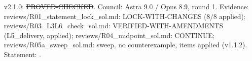\begin{proposition}\label{reg:W2-UNI_F-UNI}
\end{proposition}
\begin{statusbox}
 v2.1.0: \st{PROVED-CHECKED}. Council: Astra 9.0 / Opus 8.9, round 1. Evidence: reviews/R01\_statement\_lock\_sol.md: LOCK-WITH-CHANGES (8/8 applied); reviews/R03\_L3L6\_check\_sol.md: VERIFIED-WITH-AMENDMENTS (L5\_delivery, applied); reviews/R04\_midpoint\_sol.md: CONTINUE; reviews/R05a\_sweep\_sol.md: sweep, no counterexample, items applied (v1.1.2). Statement: .
\end{statusbox}
